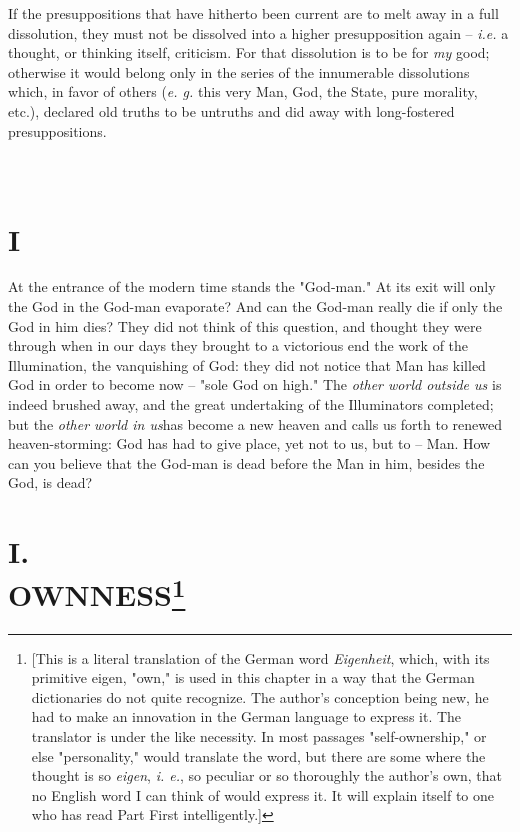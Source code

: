 \documentclass[a4paper]{book}
\begin{document}
If the presuppositions that have hitherto been current are to melt away in a 
full dissolution, they must not be dissolved into a higher presupposition 
again -- \textit{i.e.} a thought, or thinking itself, criticism. For that 
dissolution is to be for \textit{my} good; otherwise it would belong only in 
the series of the innumerable dissolutions which, in favor of others 
(\textit{e. g.} this very Man, God, the State, pure morality, etc.), declared 
old truths to be untruths and did away with long-fostered presuppositions.

\chapter[Part Second: I]{\\
I}

\medskip{}

\noindent{}At the entrance of the modern time stands the "{}God-man."{} At its 
exit will only the God in the God-man evaporate? And can the God-man really 
die if only the God in him dies? They did not think of this question, and 
thought they were through when in our days they brought to a victorious end 
the work of the Illumination, the vanquishing of God: they did not notice that 
Man has killed God in order to become now -- "{}sole God on high."{} The 
\textit{other world outside us} is indeed brushed away, and the great 
undertaking of the Illuminators completed; but the \textit{other world in 
us}has become a new heaven and calls us forth to renewed heaven-storming: God 
has had to give place, yet not to us, but to -- Man. How can you believe that 
the God-man is dead before the Man in him, besides the God, is dead?

\medskip{}

\chapter[I. Ownness]{\centering I.\\
OWNNESS\footnote{[This is a literal translation of the German word 
\textit{Eigenheit}, which, with its primitive eigen, "{}own,"{} is used in 
this chapter in a way that the German dictionaries do not quite recognize. The 
author's conception being new, he had to make an innovation in the German 
language to express it. The translator is under the like necessity. In most 
passages "{}self-ownership,"{} or else "{}personality,"{} would translate the 
word, but there are some where the thought is so \textit{eigen}, \textit{i. 
e.}, so peculiar or so thoroughly the author's own, that no English word I can 
think of would express it. It will explain itself to one who has read Part 
First intelligently.]}}
\end{document}
